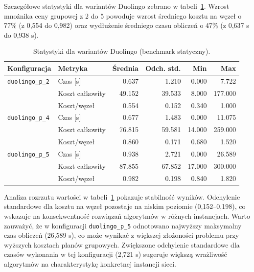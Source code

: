 Szczegółowe statystyki dla wariantów Duolingo zebrano w tabeli~\ref{tab:ext-duolingo-stats}. Wzrost mnożnika ceny grupowej z 2 do 5 powoduje wzrost średniego kosztu na węzeł o 77\% (z 0,554 do 0,982) oraz wydłużenie średniego czasu obliczeń o 47\% (z 0,637 s do 0,938 s).

\begin{table}[H]
  \centering
  \caption{Statystyki dla wariantów Duolingo (benchmark statyczny).}
  \label{tab:ext-duolingo-stats}
  \begin{tabular}{llrrrr}
    \toprule
    \textbf{Konfiguracja}   & \textbf{Metryka} & \textbf{Średnia} & \textbf{Odch. std.} & \textbf{Min} & \textbf{Max} \\
    \midrule
    \texttt{duolingo\_p\_2} & Czas [s]         & 0.637            & 1.210               & 0.000        & 7.722        \\
                            & Koszt całkowity  & 49.152           & 39.533              & 8.000        & 177.000      \\
                            & Koszt/węzeł      & 0.554            & 0.152               & 0.340        & 1.000        \\
    \midrule
    \texttt{duolingo\_p\_4} & Czas [s]         & 0.677            & 1.483               & 0.000        & 11.075       \\
                            & Koszt całkowity  & 76.815           & 59.581              & 14.000       & 259.000      \\
                            & Koszt/węzeł      & 0.860            & 0.171               & 0.680        & 1.520        \\
    \midrule
    \texttt{duolingo\_p\_5} & Czas [s]         & 0.938            & 2.721               & 0.000        & 26.589       \\
                            & Koszt całkowity  & 87.855           & 67.852              & 17.000       & 300.000      \\
                            & Koszt/węzeł      & 0.982            & 0.198               & 0.840        & 1.820        \\
    \bottomrule
  \end{tabular}
\end{table}



Analiza rozrzutu wartości w tabeli~\ref{tab:ext-duolingo-stats} pokazuje stabilność wyników. Odchylenie standardowe dla kosztu na węzeł pozostaje na niskim poziomie (0,152--0,198), co wskazuje na konsekwentność rozwiązań algorytmów w różnych instancjach. Warto zauważyć, że w konfiguracji \texttt{duolingo\_p\_5} odnotowano najwyższy maksymalny czas obliczeń (26,589 s), co może wynikać z większej złożoności problemu przy wyższych kosztach planów grupowych. Zwiększone odchylenie standardowe dla czasów wykonania w tej konfiguracji (2,721 s) sugeruje większą wrażliwość algorytmów na charakterystykę konkretnej instancji sieci.

